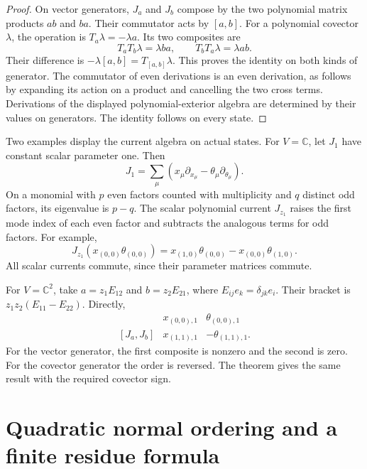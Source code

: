 \begin{proof}
On vector generators, $J_a$ and $J_b$ compose by the two polynomial
matrix products $ab$ and $ba$.
Their commutator acts by $[a,b]$.
For a polynomial covector $\lambda$, the operation is
$T_a\lambda=-\lambda a$.
Its two composites are
\[
 T_aT_b\lambda=\lambda ba,\qquad
 T_bT_a\lambda=\lambda ab.
\]
Their difference is $-\lambda[a,b]=T_{[a,b]}\lambda$.
This proves the identity on both kinds of generator.
The commutator of even derivations is an even derivation, as follows
by expanding its action on a product and cancelling the two cross terms.
Derivations of the displayed polynomial-exterior algebra are determined
by their values on generators. The identity follows on every state.
\end{proof}

Two examples display the current algebra on actual states.
For $V=\mathbb C$, let $J_1$ have constant scalar parameter one.
Then
\[
 J_1=\sum_\mu
 \left(x_\mu\partial_{x_\mu}-\theta_\mu\partial_{\theta_\mu}\right).
\]
On a monomial with $p$ even factors counted with multiplicity and $q$
distinct odd factors, its eigenvalue is $p-q$.
The scalar polynomial current $J_{z_1}$ raises the first mode index of
each even factor and subtracts the analogous terms for odd factors.
For example,
\[
 J_{z_1}(x_{(0,0)}\theta_{(0,0)})
 =x_{(1,0)}\theta_{(0,0)}-x_{(0,0)}\theta_{(1,0)}.
\]
All scalar currents commute, since their parameter matrices commute.

For $V=\mathbb C^2$, take
$a=z_1E_{12}$ and $b=z_2E_{21}$, where $E_{ij}e_k=\delta_{jk}e_i$.
Their bracket is $z_1z_2(E_{11}-E_{22})$.
Directly,
\[
 \begin{array}{c|cc}
  &x_{(0,0),1}&\theta_{(0,0),1}\\ \hline
 [J_a,J_b]&x_{(1,1),1}&-\theta_{(1,1),1}.
 \end{array}
\]
For the vector generator, the first composite is nonzero and the
second is zero. For the covector generator the order is reversed.
The theorem gives the same result with the required covector sign.

\section{Quadratic normal ordering and a finite residue formula}
\label{sec:clo-quadratic-residue}

